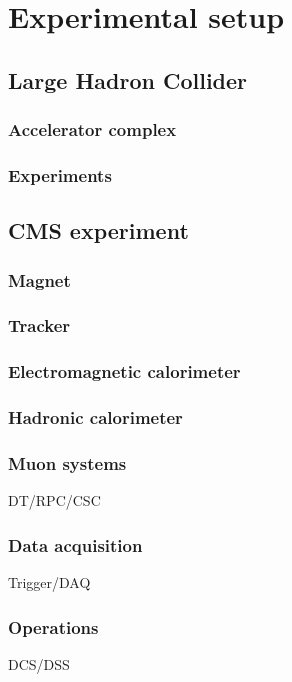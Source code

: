 \chapter{Experimental setup}

\section{Large Hadron Collider}

\subsection{Accelerator complex}

\subsection{Experiments}

\section{CMS experiment}

\subsection{Magnet}

\subsection{Tracker}

\subsection{Electromagnetic calorimeter}

\subsection{Hadronic calorimeter}

\subsection{Muon systems}
DT/RPC/CSC

\subsection{Data acquisition}
Trigger/DAQ

\subsection{Operations}
DCS/DSS
